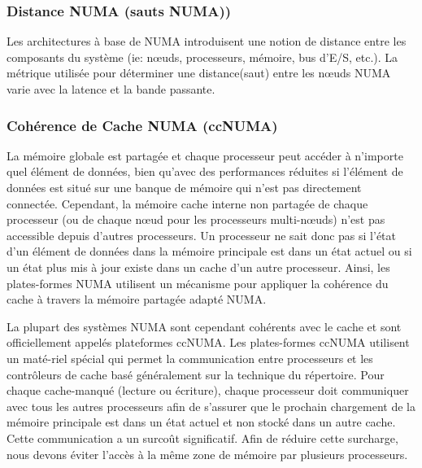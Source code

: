 \subsubsection{Distance NUMA (sauts NUMA))}
%
Les architectures à base de NUMA introduisent une notion de distance entre les composants du système (ie: nœuds, processeurs, mémoire, bus d'E/S, etc.). 
La métrique utilisée pour déterminer une distance(saut) entre les nœuds NUMA varie avec la latence et la bande passante. 
%
\subsubsection{Cohérence de Cache NUMA (ccNUMA)}
%
La mémoire globale est partagée et chaque processeur peut accéder à n'importe quel élément de données, bien qu'avec des performances réduites si l'élément de données est situé sur une banque de mémoire qui n'est pas directement connectée.
Cependant, la mémoire cache interne non partagée de chaque processeur (ou de chaque nœud pour les processeurs multi-nœuds) n'est pas accessible depuis d'autres processeurs. 
Un processeur ne sait donc pas si l'état d'un élément de données dans la mémoire principale est dans un état actuel ou si un état plus mis à jour existe dans un cache d'un autre processeur.
Ainsi, les plates-formes NUMA utilisent un mécanisme pour appliquer la cohérence du cache à travers la mémoire partagée adapté NUMA.

La plupart des systèmes NUMA sont cependant cohérents avec le cache et sont officiellement appelés plateformes ccNUMA.
Les plates-formes ccNUMA utilisent un maté-riel spécial qui permet la communication entre processeurs et les contrôleurs de cache basé généralement sur la technique du répertoire.
Pour chaque cache-manqué (lecture ou écriture), chaque processeur doit communiquer avec tous les autres processeurs afin de s'assurer que le prochain chargement de la mémoire principale est dans un état actuel et non stocké dans un autre cache.
Cette communication a un surcoût significatif.
Afin de réduire cette surcharge, nous devons éviter l'accès à la même zone de mémoire par plusieurs processeurs.
